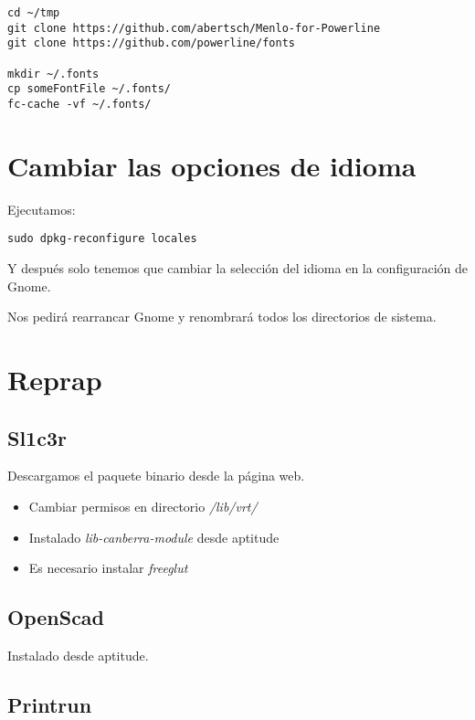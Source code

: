 \documentclass[12pt,spanish,]{article}
\providecommand{\tightlist}{%
  \setlength{\itemsep}{0pt}\setlength{\parskip}{0pt}}
\begin{document}
\begin{verbatim}
cd ~/tmp
git clone https://github.com/abertsch/Menlo-for-Powerline
git clone https://github.com/powerline/fonts

mkdir ~/.fonts
cp someFontFile ~/.fonts/
fc-cache -vf ~/.fonts/
\end{verbatim}

\section{Cambiar las opciones de
idioma}\label{cambiar-las-opciones-de-idioma}

Ejecutamos:

\begin{verbatim}
sudo dpkg-reconfigure locales
\end{verbatim}

Y después solo tenemos que cambiar la selección del idioma en la
configuración de Gnome.

Nos pedirá rearrancar Gnome y renombrará todos los directorios de
sistema.

\section{Reprap}\label{reprap}

\subsection{Sl1c3r}\label{sl1c3r}

Descargamos el paquete binario desde la página web.

\begin{itemize}
\tightlist
\item
  Cambiar permisos en directorio \emph{/lib/vrt/}
\item
  Instalado \emph{lib-canberra-module} desde aptitude
\item
  Es necesario instalar \emph{freeglut}
\end{itemize}

\subsection{OpenScad}\label{openscad}

Instalado desde aptitude.

\subsection{Printrun}\label{printrun}
\end{document}

